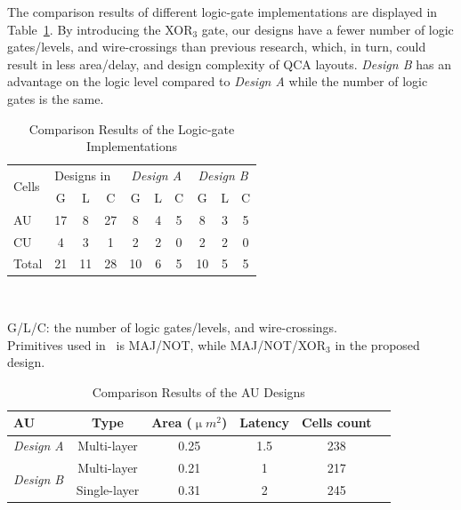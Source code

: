 \documentclass[9pt,journal,compsoc]{IEEEtran}
\begin{document}
The comparison results of different logic-gate implementations are displayed in Table~\ref{tab:logic}.
By introducing the XOR$_3$ gate, our designs have a fewer number of logic gates/levels, and wire-crossings than previous research, which, in turn, could result in less area/delay, and design complexity of QCA layouts. \emph{Design B} has an advantage on the logic level compared to \emph{Design A} while the number of logic gates is the same.

\begin{table}[t]
\caption{Comparison Results of the Logic-gate Implementations}\vspace{-2ex}
    \centering
    \begin{tabularx}{\linewidth}{Xccccccccc}
            \toprule
\multirow{2}{*}{Cells}& \multicolumn{3}{c}{Designs in~\cite{2}}&\multicolumn{3}{c}{\emph{Design A}} & \multicolumn{3}{c}{\emph{Design B} }\\
            \cmidrule(lr){2-4} \cmidrule(lr){5-7}\cmidrule(lr){8-10}
            & G & L & C & G & L & C & G & L & C \\
            \midrule
            AU & 17 & 8 & 27 & 8 & 4 & 5 & 8 & 3 & 5\\
            CU & 4 & 3 & 1 & 2 & 2 & 0 & 2 & 2 & 0\\
            \midrule
            Total & 21 & 11 & 28 & 10 & 6 & 5 & 10 & 5 & 5 \\
            \bottomrule
     \end{tabularx}~\label{tab:logic}
         \scriptsize
\begin{flushleft}
G/L/C: the number of logic gates/levels, and wire-crossings.\\
Primitives used in~\cite{2} is MAJ/NOT, while MAJ/NOT/XOR$_3$ in the proposed design.     
\end{flushleft} \vspace{-6ex}
\end{table}

\begin{table}[b] \vspace{-4ex}
\caption{Comparison Results of the AU Designs}\vspace{-2ex}
    \centering
    \begin{tabularx}{\linewidth}{Xccccc}
            \toprule
        AU & Type & Area ($\upmu m^{2}$)& Latency & Cells count \\
        \midrule
        \emph{Design A} & Multi-layer & 0.25      & 1.5            & 238                          \\
        \midrule
        \multirow{2}{*}{\emph{Design B}} & Multi-layer & 0.21      & 1              & 217                           \\
        & Single-layer & 0.31 & 2 & 245 \\
        \bottomrule
    \end{tabularx}
    \label{tab:au}
\end{table}\vspace{-2ex}
\end{document}
